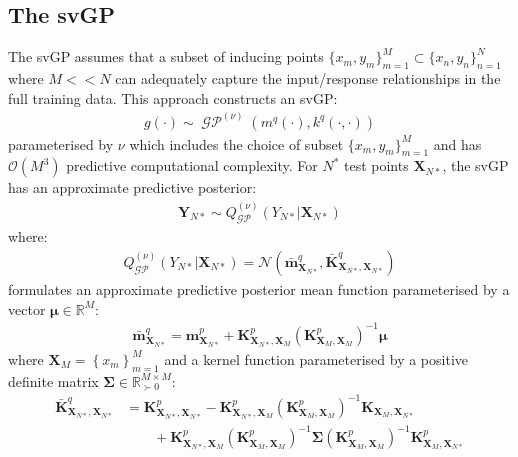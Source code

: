 \documentclass{article}
\newcommand{\GP}{\operatorname{\mathcal{GP}}}
\numberwithin{equation}{section}
\begin{document}
\subsection{The svGP}
The svGP assumes that a subset of inducing points $\{x_m, y_m\}_{m=1}^{M} \subset \{x_n, y_n\}_{n=1}^{N}$ where $M << N$ can adequately capture the input/response relationships in the full training data. This approach constructs an svGP:
\begin{align}
g(\cdot) \sim \GP^{(\nu)}\left(m^{q}(\cdot), k^{q}(\cdot, \cdot)\right)
\label{svgp}
\end{align}
parameterised by $\nu$ which includes the choice of subset $\{x_m, y_m\}_{m=1}^{M}$ and has $\mathcal{O}(M^3)$ predictive computational complexity. For $N^*$ test points $\mathbf{X}_{N*}$, the svGP has an approximate predictive posterior:
\begin{align}
    \mathbf{Y}_{N*} \sim Q_{\GP}^{(\nu)}\left(Y_{N*} \vert \mathbf{X}_{N*}\right)
\end{align}
where:
\begin{align}
    Q_{\GP}^{(\nu)}\left(Y_{N*} \vert \mathbf{X}_{N*}\right) = \mathcal{N}\left(\bar{\mathbf{m}}_{\mathbf{X}_{N*}}^{q}, \bar{\mathbf{K}}_{\mathbf{X}_{N*}, \mathbf{X}_{N*}}^{q}\right)
\end{align}
\cite{titsias2009variational} formulates an approximate predictive posterior mean function parameterised by a vector $\boldsymbol{\mu} \in \mathbb{R}^M$:
\begin{align}
    \label{svgp-mean} 
    \bar{\mathbf{m}}_{\mathbf{X}_{N*}}^{q} = \mathbf{m}^p_{\mathbf{X}_{N*}} + \mathbf{K}^p_{\mathbf{X}_{N*}, \mathbf{X}_M}\left(\mathbf{K}^p_{\mathbf{X}_M,\mathbf{X}_M}\right)^{-1} \boldsymbol{\mu}
\end{align}
where $\mathbf{X}_M = \left\{ x_m\right\}_{m=1}^M$ and a kernel function parameterised by a positive definite matrix $\mathbf{\Sigma} \in \mathbb{R}^{M\times M}_{\succ 0}$:
\begin{align}
\bar{\mathbf{K}}_{\mathbf{X}_{N*}, \mathbf{X}_{N*}}^{q} & = \mathbf{K}^p_{\mathbf{X}_{N*}, \mathbf{X}_{N*}} - \mathbf{K}^p_{\mathbf{X}_{N*}, \mathbf{X}_M} \left(\mathbf{K}^p_{\mathbf{X}_M, \mathbf{X}_M}\right)^{-1}\mathbf{K}_{\mathbf{X}_M, \mathbf{X}_{N*}} \nonumber \\
&\qquad + \mathbf{K}^p_{\mathbf{X}_{N*}, \mathbf{X}_M}  \left(\mathbf{K}^p_{\mathbf{X}_M, \mathbf{X}_M}\right)  ^{-1} \mathbf{\Sigma} \left(\mathbf{K}^p_{\mathbf{X}_M, \mathbf{X}_M}\right)^{-1}\mathbf{K}^p_{\mathbf{X}_M, \mathbf{X}_{N*}}
\label{svgp-covariance}
\end{align}
\end{document}
